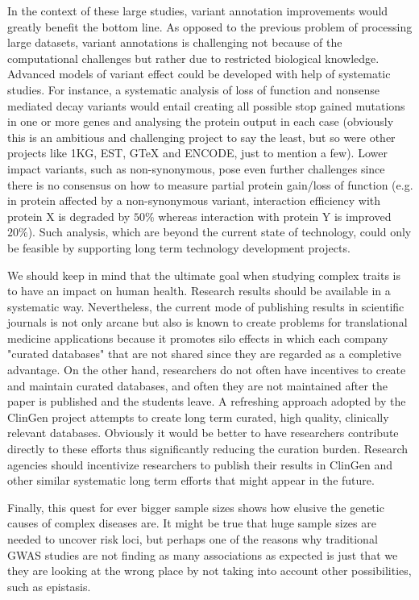 In the context of these large studies, variant annotation improvements would greatly benefit the bottom line.
As opposed to the previous problem of processing large datasets, variant annotations is challenging not because of the computational challenges but rather due to restricted biological knowledge.
Advanced models of variant effect could be developed with help of systematic studies.
For instance, a systematic analysis of loss of function and nonsense mediated decay variants would entail creating all possible stop gained mutations in one or more genes and analysing the protein output in each case (obviously this is an ambitious and challenging project to say the least, but so were other projects like 1KG, EST, GTeX and ENCODE, just to mention a few).
Lower impact variants, such as non-synonymous, pose even further challenges since there is no consensus on how to measure partial protein gain/loss of function (e.g. in protein affected by a non-synonymous variant, interaction efficiency with protein X is degraded by $50\%$ whereas interaction with protein Y is improved $20\%$).
Such analysis, which are beyond the current state of technology, could only be feasible by supporting long term technology development projects.

We should keep in mind that the ultimate goal when studying complex traits is to have an impact on human health.
Research results should be available in a systematic way.
Nevertheless, the current mode of publishing results in scientific journals is not only arcane but also is known to create problems for translational medicine applications because it promotes silo effects in which each company "curated databases" that are not shared since they are regarded as a completive advantage.
On the other hand, researchers do not often have incentives to create and maintain curated databases, and often they are not maintained after the paper is published and the students leave.
A refreshing approach adopted by the ClinGen project attempts to create long term curated, high quality, clinically relevant databases.
Obviously it would be better to have researchers contribute directly to these efforts thus significantly reducing the curation burden.
Research agencies should incentivize researchers to publish their results in ClinGen and other similar systematic long term efforts that might appear in the future.

Finally, this quest for ever bigger sample sizes shows how elusive the genetic causes of complex diseases are. 
It might be true that huge sample sizes are needed to uncover risk loci, but perhaps one of the reasons why traditional GWAS studies are not finding as many associations as expected is just that we they are looking at the wrong place by not taking into account other possibilities, such as epistasis.
